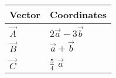 \begin{tabular}{|m{5em}|m{10em}|}
    \hline
    \textbf{Vector} &\textbf{Coordinates} \\
    \hline
         $\vec{A}$ & $2\vec{a}-3\vec{b}$ \\
    \hline
        $\vec{B}$ & $\vec{a}+\vec{b}$ \\
    \hline
	$\vec{C}$ & $\frac{5}{4}$ $\vec{a}$ \\
    \hline
\end{tabular}
